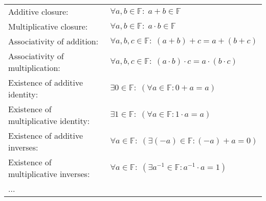 \medskip
\begin{tabular}{l l}
Additive closure: 
& $\forall a,b \in \mathbb{F}: \; a + b \in \mathbb{F}$  \\	
Multiplicative closure: 
& $\forall a,b \in \mathbb{F}: \; a \cdot b \in \mathbb{F}$  \\	
Associativity of addition: 
& $\forall a,b,c \in \mathbb{F}: \;  (a + b) + c = a + (b + c)$   \\
Associativity of multiplication: 
& $\forall a,b,c \in \mathbb{F}: \;  (a \cdot b) \cdot c = a \cdot (b \cdot c)$   \\
Existence of additive identity: 
& $\exists 0 \in \mathbb{F}: \; (\forall a \in \mathbb{F}: 0 + a = a)$ \\
Existence of multiplicative identity: 
& $\exists 1 \in \mathbb{F}: \; (\forall a \in \mathbb{F}: 1 \cdot a = a)$ \\
Existence of additive inverses: 
& $\forall a \in \mathbb{F}: \; (\exists (-a) \in \mathbb{F}: (-a) + a = 0 )$ \\
Existence of multiplicative inverses: 
& $\forall a \in \mathbb{F}: \; (\exists a^{-1} \in \mathbb{F}: a^{-1} \cdot a = 1 )$ \\


...
\end{tabular}
\medskip









